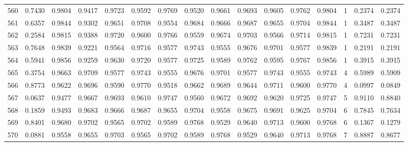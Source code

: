 \begin{tabular}{lrrrrrrrrrrrrrrr}
560 &      0.7430 &  0.9804 &  0.9417 &  0.9723 &  0.9592 &  0.9769 &  0.9520 &  0.9661 &  0.9693 &  0.9605 &   0.9762 &     0.9804 &      1 &                    0.2374 &                     0.2374 \\
561 &      0.6357 &  0.9844 &  0.9302 &  0.9651 &  0.9708 &  0.9554 &  0.9684 &  0.9666 &  0.9687 &  0.9655 &   0.9704 &     0.9844 &      1 &                    0.3487 &                     0.3487 \\
562 &      0.2584 &  0.9815 &  0.9388 &  0.9720 &  0.9600 &  0.9766 &  0.9559 &  0.9674 &  0.9703 &  0.9566 &   0.9714 &     0.9815 &      1 &                    0.7231 &                     0.7231 \\
563 &      0.7648 &  0.9839 &  0.9221 &  0.9564 &  0.9716 &  0.9577 &  0.9743 &  0.9555 &  0.9676 &  0.9701 &   0.9577 &     0.9839 &      1 &                    0.2191 &                     0.2191 \\
564 &      0.5941 &  0.9856 &  0.9259 &  0.9630 &  0.9720 &  0.9577 &  0.9725 &  0.9589 &  0.9762 &  0.9595 &   0.9767 &     0.9856 &      1 &                    0.3915 &                     0.3915 \\
565 &      0.3754 &  0.9663 &  0.9709 &  0.9577 &  0.9743 &  0.9555 &  0.9676 &  0.9701 &  0.9577 &  0.9743 &   0.9555 &     0.9743 &      4 &                    0.5989 &                     0.5909 \\
566 &      0.8773 &  0.9622 &  0.9696 &  0.9590 &  0.9770 &  0.9518 &  0.9662 &  0.9689 &  0.9644 &  0.9711 &   0.9600 &     0.9770 &      4 &                    0.0997 &                     0.0849 \\
567 &      0.0637 &  0.9477 &  0.9667 &  0.9693 &  0.9610 &  0.9747 &  0.9560 &  0.9672 &  0.9692 &  0.9620 &   0.9725 &     0.9747 &      5 &                    0.9110 &                     0.8840 \\
568 &      0.1859 &  0.9493 &  0.9683 &  0.9666 &  0.9687 &  0.9655 &  0.9704 &  0.9558 &  0.9675 &  0.9691 &   0.9625 &     0.9704 &      6 &                    0.7845 &                     0.7634 \\
569 &      0.8401 &  0.9680 &  0.9702 &  0.9565 &  0.9702 &  0.9589 &  0.9768 &  0.9529 &  0.9640 &  0.9713 &   0.9600 &     0.9768 &      6 &                    0.1367 &                     0.1279 \\
570 &      0.0881 &  0.9558 &  0.9655 &  0.9703 &  0.9565 &  0.9702 &  0.9589 &  0.9768 &  0.9529 &  0.9640 &   0.9713 &     0.9768 &      7 &                    0.8887 &                     0.8677 \\

\end{tabular}
